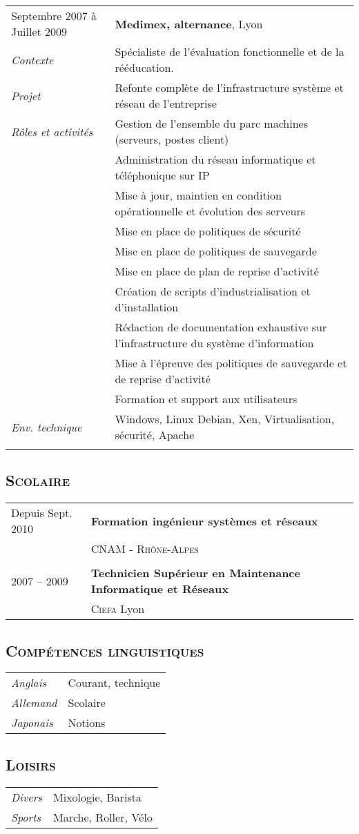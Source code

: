 \documentclass[a4paper]{article}
\newcommand{\hsubsection}[1]{\subsection*{\fontfamily{phv}\selectfont\textsc{#1}}}
\begin{document}
\begin{tabular}{P{3.5cm}|p{13cm}}
Septembre 2007 à Juillet 2009	& \textbf{Medimex, alternance}, Lyon\\
\textsl{Contexte}		& Spécialiste de l’évaluation fonctionnelle et de la rééducation.\\
\textsl{Projet}			& Refonte complète de l'infrastructure système et réseau de l'entreprise\\
\textsl{Rôles et activités} 	& Gestion de l'ensemble du parc machines (serveurs, postes client)\\
				& Administration du réseau informatique et téléphonique sur IP\\
				& Mise à jour, maintien en condition opérationnelle et évolution des serveurs\\
				& Mise en place de politiques de sécurité\\
				& Mise en place de politiques de sauvegarde\\
				& Mise en place de plan de reprise d'activité\\
				& Création de scripts d'industrialisation et d'installation\\
				& Rédaction de documentation exhaustive sur l'infrastructure du système d'information\\
				& Mise à l'épreuve des politiques de sauvegarde et de reprise d'activité\\
				& Formation et support aux utilisateurs\\
\textsl{Env. technique}		& Windows, Linux Debian, Xen, Virtualisation, sécurité, Apache\\
 & \\
\end{tabular}

\hsubsection{Scolaire}
\begin{tabular}{P{3.5cm}|p{13cm}}
Depuis Sept. 2010		& \textbf{Formation ingénieur systèmes et réseaux}\\
	& \textsc{CNAM - Rhône-Alpes}\\
 & \\
2007 -- 2009 			& \textbf{Technicien Supérieur en Maintenance Informatique et Réseaux}\\
	& \textsc{Ciefa} Lyon\\
\end{tabular}

\hsubsection{Compétences linguistiques}
\begin{tabular}{P{3.5cm}|p{13cm}}
\textsl{Anglais}		& Courant, technique\\
\textsl{Allemand}		& Scolaire\\
\textsl{Japonais}		& Notions\\
\end{tabular}

\hsubsection{Loisirs}
\begin{tabular}{P{3.5cm}|p{13cm}}
\textsl{Divers}			& Mixologie, Barista\\
\textsl{Sports}			& Marche, Roller, Vélo\\
\end{tabular}
\end{document}
